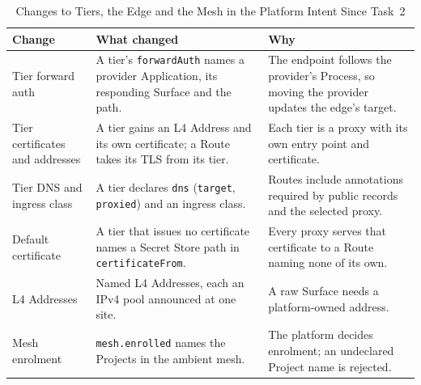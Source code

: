 \begin{table}[!htbp]
\centering
\footnotesize
\begin{tabular}{>{\raggedright\arraybackslash}p{}>{\raggedright\arraybackslash}p{}>{\raggedright\arraybackslash}p{}}
\hline
\textbf{Change} & \textbf{What changed} & \textbf{Why} \\
\hline
Tier forward auth & A tier's \texttt{forwardAuth} names a provider Application, its responding Surface and the path. & The endpoint follows the provider's Process, so moving the provider updates the edge's target. \\
Tier certificates and addresses & A tier gains an L4 Address and its own certificate; a Route takes its TLS from its tier. & Each tier is a proxy with its own entry point and certificate. \\
Tier DNS and ingress class & A tier declares \texttt{dns} (\texttt{target}, \texttt{proxied}) and an ingress class. & Routes include annotations required by public records and the selected proxy. \\
Default certificate & A tier that issues no certificate names a Secret Store path in \texttt{certificateFrom}. & Every proxy serves that certificate to a Route naming none of its own. \\
L4 Addresses & Named L4 Addresses, each an IPv4 pool announced at one site. & A raw Surface needs a platform-owned address. \\
Mesh enrolment & \texttt{mesh.enrolled} names the Projects in the ambient mesh. & The platform decides enrolment; an undeclared Project name is rejected. \\
\hline
\end{tabular}
\caption{Changes to Tiers, the Edge and the Mesh in the Platform Intent Since Task~2}
\label{tab:app-platform-2}
\end{table}

